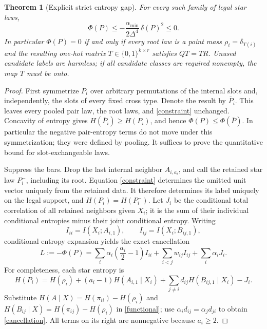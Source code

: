 \documentclass[11pt]{article}
\newtheorem{theorem}{Theorem}
\begin{document}
\begin{theorem}[Explicit strict entropy gap]
For every such family of legal star laws,
\begin{equation}
 \Phi(P)\leq-\frac{\alpha_{\min}}{2\Delta^4}\,\delta(P)^2\leq0.
 \label{gap}
\end{equation}
In particular $\Phi(P)=0$ if and only if every root law is a point mass
$\rho_i=\delta_{T(i)}$ and the resulting one-hot matrix $T\in\{0,1\}^{k\times r}$
satisfies $QT=TR$. Unused candidate labels are harmless; if all candidate
classes are required nonempty, the map $T$ must be onto.
\end{theorem}

\begin{proof}
First symmetrize $P_i$ over arbitrary permutations of the internal slots
and, independently, the slots of every fixed cross type. Denote the result
by $\overline P_i$. This leaves every pooled pair law, the root laws, and
\eqref{constraint} unchanged. Concavity of entropy gives
$H(\overline P_i)\geq H(P_i)$, and hence
$\Phi(P)\leq\Phi(\overline P)$. In particular the negative pair-entropy
terms do not move under this symmetrization; they were defined by pooling.
It suffices to prove the quantitative bound for slot-exchangeable laws.

Suppress the bars. Drop the last internal neighbor $A_{i,a_i}$, and call
the retained star law $P_i^-$, including its root. Equation
\eqref{constraint} determines the omitted unit vector uniquely from the
retained data. It therefore determines its label uniquely on the legal
support, and $H(P_i)=H(P_i^-)$. Let $J_i$ be the conditional total
correlation of all retained neighbors given $X_i$; it is the sum of their
individual conditional entropies minus their joint conditional entropy.
Writing
\[
 I_{ii}=I(X_i;A_{i,1}),\qquad I_{ij}=I(X_i;B_{ij,1}),
\]
conditional entropy expansion yields the exact cancellation
\begin{equation}
 L:=-\Phi(P)=
 \sum_i\alpha_i\left(\frac{a_i}{2}-1\right)I_{ii}
 +\sum_{i<j}w_{ij}I_{ij}+\sum_i\alpha_iJ_i.
 \label{cancellation}
\end{equation}
For completeness, each star entropy is
\[
 H(P_i)=H(\rho_i)+(a_i-1)H(A_{i,1}\mid X_i)
       +\sum_{j\ne i}d_{ij}H(B_{ij,1}\mid X_i)-J_i.
\]
Substitute $H(A\mid X)=H(\pi_{ii})-H(\rho_i)$ and
$H(B_{ij}\mid X)=H(\pi_{ij})-H(\rho_i)$ in \eqref{functional}; use
$\alpha_i d_{ij}=\alpha_jd_{ji}$ to obtain \eqref{cancellation}.
All terms on its right are nonnegative because $a_i\geq2$.


\end{proof}
\end{document}
